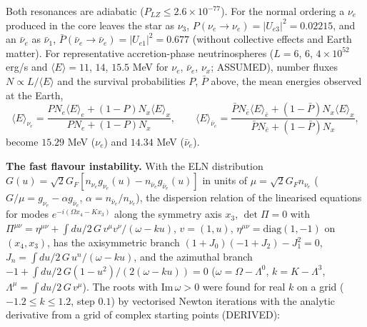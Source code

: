 \documentclass[
  10pt,
]{article}
\begin{document}
Both resonances are adiabatic (\(P_{LZ} \le 2.6\times10^{-77}\)). For
the normal ordering a \(\nu_e\) produced in the core leaves the star as
\(\nu_3\), \(P(\nu_e\to\nu_e) = \lvert U_{e3}\rvert^2 = 0.02215\), and
an \(\bar\nu_e\) as \(\bar\nu_1\),
\(\bar P(\bar\nu_e\to\bar\nu_e) = \lvert U_{e1}\rvert^2 = 0.677\)
(without collective effects and Earth matter). For representative
accretion-phase neutrinospheres (\(L = 6\), \(6\), \(4\times10^{52}\)
erg/s and \(\langle E\rangle = 11\), \(14\), \(15.5\) MeV for \(\nu_e\),
\(\bar\nu_e\), \(\nu_x\); ASSUMED), number fluxes
\(N \propto L/\langle E\rangle\) and the survival probabilities \(P\),
\(\bar P\) above, the mean energies observed at the Earth,
\[ \langle E\rangle_{\nu_e} = \frac{PN_e\langle E\rangle_e + (1 - P)N_x\langle E\rangle_x}{PN_e + (1 - P)N_x},\qquad
   \langle E\rangle_{\bar\nu_e} = \frac{\bar PN_{\bar e}\langle E\rangle_{\bar e} + (1 - \bar P)N_x\langle E\rangle_x}{\bar PN_{\bar e} + (1 - \bar P)N_x}, \]
become \(15.29\) MeV (\(\nu_e\)) and \(14.34\) MeV (\(\bar\nu_e\)).

\textbf{The fast flavour instability.} With the ELN distribution
\(G(u) = \sqrt2G_F[n_{\nu_e}g_{\nu_e}(u) - n_{\bar\nu_e}g_{\bar\nu_e}(u)]\)
in units of \(\mu = \sqrt2G_Fn_{\nu_e}\)
(\(G/\mu = g_{\nu_e} - \alpha g_{\bar\nu_e}\),
\(\alpha = n_{\bar\nu_e}/n_{\nu_e}\)), the dispersion relation of the
linearised equations for modes \(e^{-i(\Omega x_4 - Kx_3)}\) along the
symmetry axis \(x_3\), \(\det\Pi = 0\) with
\(\Pi^{\mu\nu} = \eta^{\mu\nu} + \int du/2\,G\,v^\mu v^\nu/(\omega - ku)\),
\(v = (1, u)\), \(\eta^{\mu\nu} = \mathrm{diag}(1, -1)\) on
\((x_4, x_3)\), has the axisymmetric branch
\((1 + J_0)(-1 + J_2) - J_1^2 = 0\),
\(J_n = \int du/2\,G\,u^n/(\omega - ku)\), and the azimuthal branch
\(-1 + \int du/2\,G(1 - u^2)/(2(\omega - ku)) = 0\)
(\(\omega = \Omega - \Lambda^0\), \(k = K - \Lambda^3\),
\(\Lambda^\mu = \int du/2\,G\,v^\mu\)). The roots with
\(\mathrm{Im}\,\omega > 0\) were found for real \(k\) on a grid
(\(-1.2 \le k \le 1.2\), step \(0.1\)) by vectorised Newton iterations
with the analytic derivative from a grid of complex starting points
(DERIVED):
\end{document}
